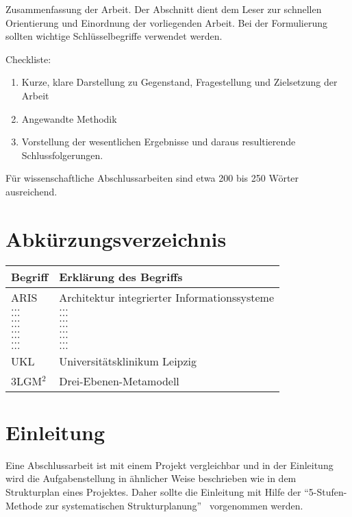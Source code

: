 \documentclass[headsepline,titlepage,twoside,12pt]{report}
\begin{document}
Zusammenfassung der Arbeit. Der Abschnitt dient dem Leser zur schnellen Orientierung und Einordnung der vorliegenden Arbeit. Bei der Formulierung sollten wichtige Schlüsselbegriffe verwendet werden. 

Checkliste:
\begin{enumerate}
\item Kurze, klare Darstellung zu Gegenstand, Fragestellung und Zielsetzung der Arbeit
\item Angewandte Methodik
\item Vorstellung der wesentlichen Ergebnisse und daraus resultierende Schlussfolgerungen.
\end{enumerate}
Für wissenschaftliche Abschlussarbeiten sind etwa 200 bis 250 Wörter ausreichend.

\chapter*{Abkürzungsverzeichnis}
\begin{tabularx}{\textwidth}{lX}
\toprule
\textrm{Begriff}			&\textrm{Erklärung des Begriffs}\\
\midrule
ARIS					&Architektur integrierter Informationssysteme\\
$\ldots$				&$\ldots$\\
$\ldots$				&$\ldots$\\
$\ldots$				&$\ldots$\\
$\ldots$				&$\ldots$\\
$\ldots$				&$\ldots$\\
$\ldots$				&$\ldots$\\
$\ldots$				&$\ldots$\\
$\ldots$				&$\ldots$\\
UKL					&Universitätsklinikum Leipzig\\
3LGM$^2$				&Drei-Ebenen-Metamodell\\

\bottomrule
\end{tabularx}

\chapter{Einleitung}\label{ch:introduction}
Eine Abschlussarbeit ist mit einem Projekt vergleichbar und in der Einleitung wird die Aufgabenstellung in ähnlicher Weise beschrieben wie in dem Strukturplan eines Projektes.
Daher sollte die Einleitung mit Hilfe der \enquote{5-Stufen-Methode zur systematischen Strukturplanung}~\citep{ob}\footnotemark{} vorgenommen werden.
\end{document}
